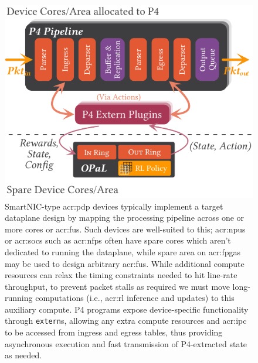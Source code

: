 \begin{figure}
	\centering
	\includegraphics[keepaspectratio, width=0.85\linewidth]{diagrams/opal/arch-with-p4}
	\caption[\approachshort{}'s off-path interaction model with respect to a co-hosted P4 dataplane.]{SmartNIC-type \gls{acr:pdp} devices typically implement a target dataplane design by mapping the processing pipeline across one or more cores or \glspl{acr:fu}. Such devices are well-suited to this; \glspl{acr:npu} or \glspl{acr:soc} such as \glspl{acr:nfp} often have spare cores which aren't dedicated to running the dataplane, while spare area on \glspl{acr:fpga} may be used to design arbitrary \glspl{acr:fu}. While additional compute resources can relax the timing constraints needed to hit line-rate throughput, to prevent packet stalls as required we must move long-running computations (i.e., \gls{acr:rl} inference and updates) to this auxiliary compute. P4 programs expose device-specific functionality through \texttt{extern}s, allowing any extra compute resources and \gls{acr:ipc} to be accessed from ingress and egress tables, thus providing asynchronous execution and fast transmission of P4-extracted state as needed.\label{fig:netro-arch}}
\end{figure}

%
%
%

